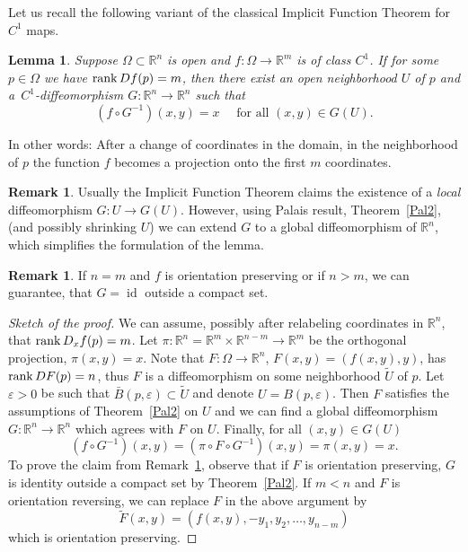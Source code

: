 \documentclass[12pt,leqno]{amsart}
\newtheorem{lemma}[theorem]{Lemma}
\theoremstyle{definition}
\newtheorem{remark}[theorem]{Remark}
\newcommand{\bbbr}{\mathbb R}
\newcommand{\eps}{\varepsilon}
\def\rank{{\rm rank\,}}
\numberwithin{theorem}{section} \numberwithin{equation}{section}
\begin{document}
Let us recall the following variant of the classical Implicit Function Theorem for $C^1$ maps.
\begin{lemma}
\label{TFU}
Suppose $\Omega\subset\bbbr^n$ is open and $f:\Omega\to \bbbr^m$ is of class $C^1$. If for some $p\in \Omega$ we have $\rank Df(p)=m$, then there exist an open neighborhood $U$ of $p$ and a~$C^1$-diffeomorphism $G:\bbbr^n\to\bbbr^n$
such that
$$
(f\circ G^{-1})(x,y)=x \quad \text{ for all }(x,y)\in G(U).
$$
\end{lemma}
In other words: After a change of coordinates in the domain, in the neighborhood of $p$ the function $f$ becomes a projection onto the first $m$ coordinates.
\begin{remark}
Usually the Implicit Function Theorem claims the existence of a \emph{local} diffeomorphism $G:U\to G(U)$. However, using Palais result, Theorem~\ref{Pal2}, (and possibly shrinking $U$) we can extend $G$ to a global diffeomorphism of $\bbbr^n$, which simplifies the formulation of the lemma.
\end{remark}
\begin{remark}
\label{IR1}
If $n=m$ and $f$ is orientation preserving or if $n>m$, we can guarantee, that $G=\operatorname{id}$ outside a compact set.
\end{remark}
\begin{proof}[Sketch of the proof]
We can assume, possibly after relabeling coordinates in $\bbbr^n$, that $\rank D_x f(p)=m$. Let $\pi:\bbbr^n=\bbbr^m\times \bbbr^{n-m}\to \bbbr^m$ be the orthogonal projection, $\pi(x,y)=x$. Note that $F:\Omega\to\bbbr^n$, $F(x,y)=(f(x,y),y)$, has $\rank DF(p)=n$, thus $F$ is a diffeomorphism on some neighborhood $\tilde U$ of $p$. Let $\eps>0$ be such that $\bar{B}(p,\eps)\subset \tilde U$ and denote $U=B(p,\eps)$. Then $F$ satisfies the assumptions of Theorem~\ref{Pal2} on $U$ and we can find a global diffeomorphism $G:\bbbr^n\to\bbbr^n$ which agrees with $F$ on $U$. Finally, for all $(x,y)\in G(U)$
$$
(f\circ G^{-1})(x,y)=(\pi\circ F\circ G^{-1})(x,y)=\pi(x,y)=x.
$$
To prove the claim from Remark~\ref{IR1}, observe that if $F$ is orientation preserving, $G$ is identity outside a compact set by Theorem~\ref{Pal2}. If $m<n$ and $F$ is orientation reversing, we can replace $F$ in the above argument by
$$
\widetilde{F}(x,y)=(f(x,y),-y_1,y_2,\ldots,y_{n-m})
$$
which is orientation preserving.
\end{proof}
\end{document}
